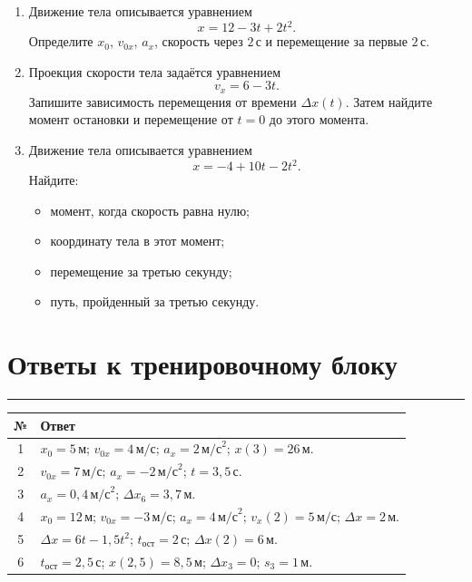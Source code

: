 \documentclass[a4paper,12pt]{article}
\newcommand{\sectionline}{%
  \vspace{0.1em}
  \noindent\textcolor{accent}{\rule{\linewidth}{0.5pt}}
  \vspace{0.45em}
}
\newcommand{\ms}{\,\text{м/с}}
\newcommand{\mss}{\,\text{м/с}^{2}}
\newcommand{\metre}{\,\text{м}}
\newcommand{\second}{\,\text{с}}
\begin{document}
\begin{enumerate}[label=\textbf{\arabic*.},resume]

  \item
  Движение тела описывается уравнением
  \[
    x=12-3t+2t^2.
  \]
  Определите $x_0$, $v_{0x}$, $a_x$, скорость через $2\second$ и перемещение за первые $2\second$.

  \item
  Проекция скорости тела задаётся уравнением
  \[
    v_x=6-3t.
  \]
  Запишите зависимость перемещения от времени $\Delta x(t)$. Затем найдите момент остановки и перемещение от $t=0$ до этого момента.

  \item
  Движение тела описывается уравнением
  \[
    x=-4+10t-2t^2.
  \]
  Найдите:
  \begin{itemize}
    \item момент, когда скорость равна нулю;
    \item координату тела в этот момент;
    \item перемещение за третью секунду;
    \item путь, пройденный за третью секунду.
  \end{itemize}

\end{enumerate}


\clearpage

\section*{Ответы к тренировочному блоку}
\sectionline

\renewcommand{\arraystretch}{1.4}
\begin{table}[ht]
\centering
\begin{tabularx}{\linewidth}{@{}c>{\raggedright\arraybackslash}X@{}}
\toprule
\textbf{№} & \textbf{Ответ} \\
\midrule
1 & $x_0=5\metre$; $v_{0x}=4\ms$; $a_x=2\mss$; $x(3)=26\metre$. \\
2 & $v_{0x}=7\ms$; $a_x=-2\mss$; $t=3{,}5\second$. \\
3 & $a_x=0{,}4\mss$; $\Delta x_6=3{,}7\metre$. \\
4 & $x_0=12\metre$; $v_{0x}=-3\ms$; $a_x=4\mss$; $v_x(2)=5\ms$; $\Delta x=2\metre$. \\
5 & $\Delta x=6t-1{,}5t^2$; $t_{\text{ост}}=2\second$; $\Delta x(2)=6\metre$. \\
6 & $t_{\text{ост}}=2{,}5\second$; $x(2{,}5)=8{,}5\metre$; $\Delta x_3=0$; $s_3=1\metre$. \\
\bottomrule
\end{tabularx}
\end{table}
\end{document}
